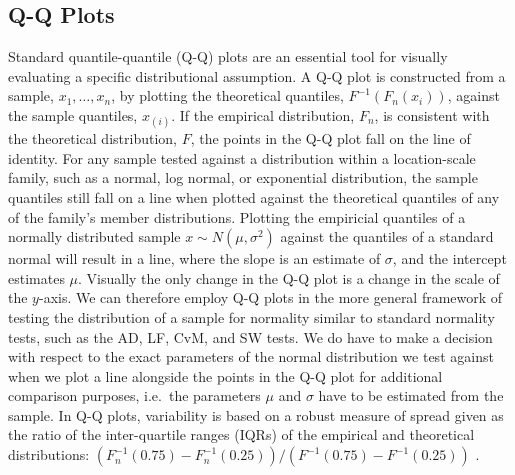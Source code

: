 \documentclass{article}\usepackage[]{graphicx}\usepackage[]{color}
\newcommand{\alnote}[1]{\todo[inline,color=green!40]{#1}}
\newcommand{\hhnote}[1]{\todo[inline,color=magenta!40]{#1}}
\begin{document}
\subsection{Q-Q Plots}

Standard quantile-quantile (Q-Q) plots \citep{Wilk:1968} are an essential tool for  visually evaluating a specific distributional assumption.  A Q-Q plot  is constructed from a sample, $x_1, \ldots, x_n$, by plotting the theoretical quantiles, $F^{-1}(F_n(x_i))$, against the sample quantiles, $x_{(i)}$. If the empirical distribution, $F_n$, is consistent with the theoretical distribution, $F$, the points in the Q-Q plot fall on the line of identity. 
For any sample tested against a distribution within a location-scale family, such as a normal, log normal, or exponential distribution, the sample quantiles still fall on a line when plotted against the theoretical quantiles of any of the family's member distributions. Plotting the empiricial quantiles of a normally distributed sample $x \sim N(\mu, \sigma^2)$ against the quantiles of a standard normal will result in a line, where  the slope is an estimate of $\sigma$, and the intercept estimates $\mu$. Visually  the only change in the Q-Q plot is a  change in the scale of the $y$-axis. We can therefore employ Q-Q plots in the more general framework of testing the distribution of a sample for normality similar to standard normality tests, such as the AD, LF, CvM, and SW tests. We do have to make a decision with respect to the exact parameters of the normal distribution we test against when we plot a line alongside the points in the Q-Q plot for additional comparison purposes, i.e.~the parameters $\mu$ and $\sigma$ have to be estimated from the sample. In Q-Q plots, variability is based on a robust measure of spread given as the ratio of the inter-quartile ranges (IQRs) of the empirical and theoretical distributions: $\left(F^{-1}_n(0.75) - F^{-1}_n(0.25)\right) / \left(F^{-1}(0.75) - F^{-1}(0.25)\right)$ \citep{becker:s}. 

\end{document}
